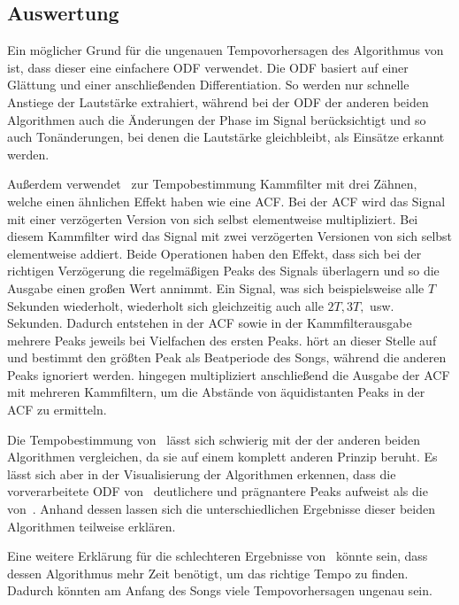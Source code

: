 {	\subsection{Auswertung}
	{

		Ein möglicher Grund für die ungenauen Tempovorhersagen des Algorithmus von~\cite{2001_BeatThis}
			ist,
			dass dieser eine einfachere \ac{ODF} verwendet.
		Die \ac{ODF} basiert auf einer Glättung und einer anschlie{\ss}enden Differentiation.
		So werden nur schnelle Anstiege der Lautstärke extrahiert,
			während bei der \ac{ODF} der anderen beiden Algorithmen auch die Änderungen der Phase im Signal berücksichtigt
			und so auch Tonänderungen,
			bei denen die Lautstärke gleichbleibt,
			als Einsätze erkannt werden.

		Au{\ss}erdem verwendet~\cite{2001_BeatThis} zur Tempobestimmung Kammfilter mit drei Zähnen,
			welche einen ähnlichen Effekt haben wie eine \ac{ACF}.
		Bei der \ac{ACF} wird das Signal mit einer verzögerten Version von sich selbst elementweise multipliziert.
		Bei diesem Kammfilter wird das Signal mit zwei verzögerten Versionen von sich selbst elementweise addiert.
		Beide Operationen haben den Effekt,
			dass sich bei der richtigen Verzögerung
			die regelmä{\ss}igen Peaks des Signals überlagern
			und so die Ausgabe einen gro{\ss}en Wert annimmt.
		Ein Signal,
			was sich beispielsweise alle $T$ Sekunden wiederholt,
			wiederholt sich gleichzeitig auch alle $2T, 3T,$ usw. Sekunden.
		Dadurch entstehen in der \ac{ACF} sowie in der Kammfilterausgabe mehrere Peaks jeweils bei Vielfachen des ersten Peaks.
		\cite{2001_BeatThis} hört an dieser Stelle auf
			und bestimmt den grö{\ss}ten Peak als Beatperiode des Songs,
			während die anderen Peaks ignoriert werden.
		\cite{2009_DaPlSt} hingegen multipliziert anschlie{\ss}end die Ausgabe der \ac{ACF} mit mehreren Kammfiltern,
			um die Abstände von äquidistanten Peaks in der \ac{ACF} zu ermitteln.

		Die Tempobestimmung von~\cite{2011_PlRoSt} lässt sich schwierig mit der der anderen beiden Algorithmen vergleichen,
			da sie auf einem komplett anderen Prinzip beruht.
		Es lässt sich aber in der Visualisierung der Algorithmen erkennen,
			dass die vorverarbeitete \ac{ODF} von~\cite{2009_DaPlSt} deutlichere und prägnantere Peaks aufweist
			als die von~\cite{2011_PlRoSt}.
		Anhand dessen lassen sich die unterschiedlichen Ergebnisse dieser beiden Algorithmen teilweise erklären.

		Eine weitere Erklärung für die schlechteren Ergebnisse von~\cite{2011_PlRoSt} könnte sein,
			dass dessen Algorithmus mehr Zeit benötigt,
			um das richtige Tempo zu finden.
		Dadurch könnten am Anfang des Songs viele Tempovorhersagen ungenau sein.
	}
}

